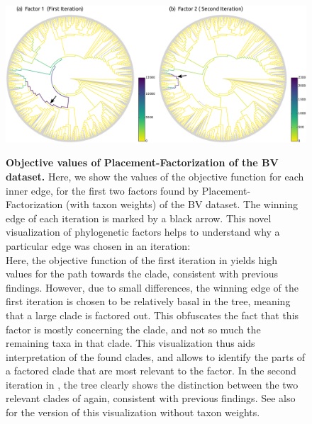 \begin{figure}[hbt!]
    \centering
    \includegraphics[width=\linewidth]{pdf/pf_bv_place_tw_ovs.pdf}
    \begin{subfigure}{0pt}
        \label{fig:pf_bv_place_tw_ovs:sub:first}
    \end{subfigure}
    \begin{subfigure}{0pt}
        \label{fig:pf_bv_place_tw_ovs:sub:second}
    \end{subfigure}
    \caption[Objective values of Placement-Factorization of the \ac{BV} dataset]{
        \textbf{Objective values of Placement-Factorization of the \ac{BV} dataset.}
        Here, we show the values of the objective function for each inner edge,
        for the first two factors found by Placement-Factorization (with taxon weights) of the \ac{BV} dataset.
        The winning edge of each iteration is marked by a black arrow.
        This novel visualization of phylogenetic factors helps to understand
        why a particular edge was chosen in an iteration:
        \\
        Here, the objective function of the first iteration in 
        yields high values for the path towards the  clade, consistent with previous findings.
        However, due to small differences, the winning edge of the first iteration
        is chosen to be relatively basal in the tree, meaning that a large clade is factored out.
        This obfuscates the fact that this factor is mostly concerning the  clade,
        and not so much the remaining taxa in that clade.
        This visualization thus aids interpretation of the found clades,
        and allows to identify the parts of a factored clade that are most relevant to the factor.
        In the second iteration in ,
        the tree clearly shows the distinction between the two relevant clades of  again,
        consistent with previous findings.
        See also  for the version of this visualization without taxon weights.
    }
    \label{fig:pf_bv_place_tw_ovs}
\end{figure}

